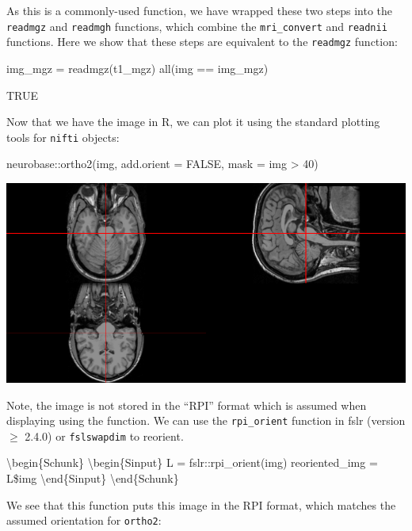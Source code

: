 As this is a commonly-used function, we have wrapped these two steps
into the \texttt{readmgz} and \texttt{readmgh} functions, which combine
the \texttt{mri\_convert} and \texttt{readnii} functions. Here we show
that these steps are equivalent to the \texttt{readmgz} function:

\begin{Schunk}
\begin{Sinput}
img_mgz = readmgz(t1_mgz)
all(img == img_mgz)
\end{Sinput}
\begin{Soutput}
[1] TRUE
\end{Soutput}
\end{Schunk}

Now that we have the image in R, we can plot it using the standard
plotting tools for \texttt{nifti} objects:

\begin{Schunk}
\begin{Sinput}
neurobase::ortho2(img, add.orient = FALSE, mask = img > 40)
\end{Sinput}

\includegraphics{Freesurfer_files/figure-latex/mri_plot-1} \end{Schunk}

Note, the image is not stored in the ``RPI'' format which is assumed
when displaying using the   function. We can
use the \texttt{rpi\_orient} function in fslr (version \(\geq\) 2.4.0)
or \texttt{fslswapdim} to reorient.

\textbackslash{}begin\{Schunk\} \textbackslash{}begin\{Sinput\} L =
fslr::rpi\_orient(img) reoriented\_img = L\$img
\textbackslash{}end\{Sinput\} \textbackslash{}end\{Schunk\}

We see that this function puts this image in the RPI format, which
matches the assumed orientation for \texttt{ortho2}:

